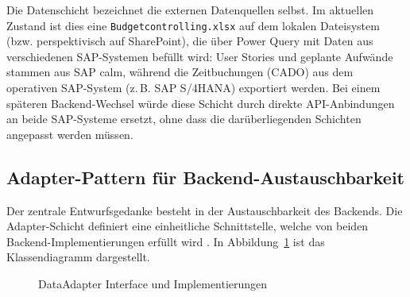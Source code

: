Die Datenschicht bezeichnet die externen Datenquellen selbst. Im aktuellen Zustand ist dies eine \texttt{Budgetcontrolling.xlsx} auf dem lokalen Dateisystem (bzw. perspektivisch auf SharePoint), die über Power Query mit Daten aus verschiedenen SAP-Systemen befüllt wird: User Stories und geplante Aufwände stammen aus SAP \gls{calm}, während die Zeitbuchungen (CADO) aus dem operativen SAP-System (z.\,B. SAP S/4HANA) exportiert werden. Bei einem späteren Backend-Wechsel würde diese Schicht durch direkte API-Anbindungen an beide SAP-Systeme ersetzt, ohne dass die darüberliegenden Schichten angepasst werden müssen.

\subsection{Adapter-Pattern für Backend-Austauschbarkeit}

Der zentrale Entwurfsgedanke besteht in der Austauschbarkeit des Backends. Die Adapter-Schicht definiert eine einheitliche Schnittstelle, welche von beiden Backend-Implementierungen erfüllt wird \citep{gamma1994}. In Abbildung~\ref{fig:adapter-detail} ist das Klassendiagramm dargestellt.

\begin{figure}[H]
\centering
{}
\caption{DataAdapter Interface und Implementierungen}
\label{fig:adapter-detail}
\end{figure}

